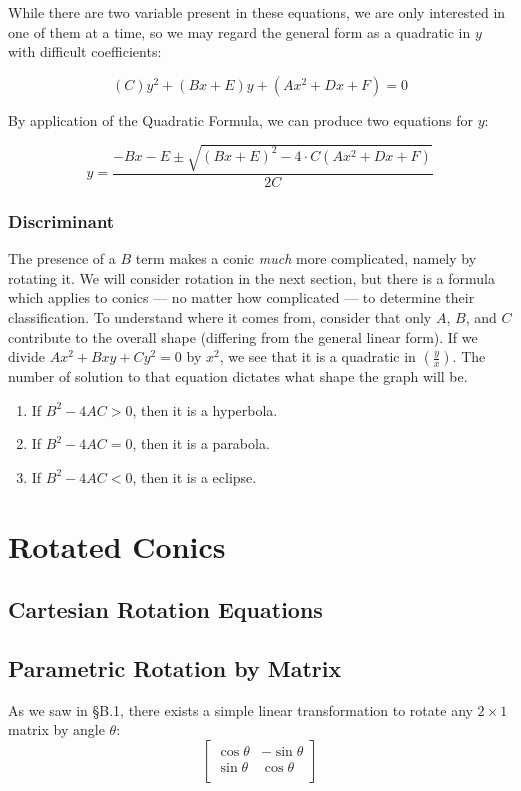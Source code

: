 While there are two variable present in these equations, we are only interested in one of them
at a time, so we may regard the general form as a quadratic in $y$ with difficult coefficients:

\begin{equation*}
(C)y^2 + (Bx + E)y + (Ax^2  + Dx + F) = 0
\end{equation*}

By application of the Quadratic Formula, we can produce two equations for $y$:

\begin{equation}
y = \frac{-Bx - E \pm \sqrt{(Bx + E)^2 - 4\cdot{}C(Ax^2 + Dx + F)}}{2C}
\end{equation}

\subsubsection{Discriminant}
The presence of a $B$ term makes a conic \emph{much} more complicated, namely by 
rotating it.  We will consider rotation in the next section, but there is a formula which
applies to conics --- no matter how complicated --- to determine their classification.
To understand where it comes from, consider that only $A$, $B$, and $C$ contribute
to the overall shape (differing from the general linear form).  If we divide
$Ax^2 + Bxy + Cy^2 = 0$ by $x^2$, we see that it is a quadratic in $\left(\frac{y}{x}\right)$.
The number of solution to that equation dictates what shape the graph will be.
\begin{enumerate}
\item If $B^2 - 4AC > 0$, then it is a hyperbola.
\item If $B^2 - 4AC = 0$, then it is a parabola.
\item If $B^2 - 4AC < 0$, then it is a eclipse.
\end{enumerate}



\newpage
\section{Rotated Conics}
\subsection{Cartesian Rotation Equations}

\subsection{Parametric Rotation by Matrix}
As we saw in §B.1, there exists a simple linear transformation to rotate any $2\times 1$ 
matrix by angle $\theta$:
\begin{equation*}
\begin{bmatrix}
	\cos\theta & -\sin\theta \\
	\sin\theta & \cos\theta \\
\end{bmatrix}
\end{equation*}

